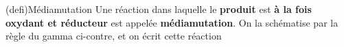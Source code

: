 \documentclass[../../main/main.tex]{subfiles}
\begin{document}
\begin{tcb*}[sidebyside, righthand ratio=.3](defi){Médiamutation}
	Une réaction dans laquelle le \textbf{produit} est \textbf{à la fois oxydant
		et réducteur} est appelée \textbf{médiamutation}. On la schématise par la
	règle du gamma ci-contre, et on écrit cette réaction
	\psw{
		\[
			\ce{A + B = 2C}
		\]
	}
	\vspace{-15pt}
	\tcblower
	\begin{center}
	\end{center}
\end{tcb*}
\end{document}
